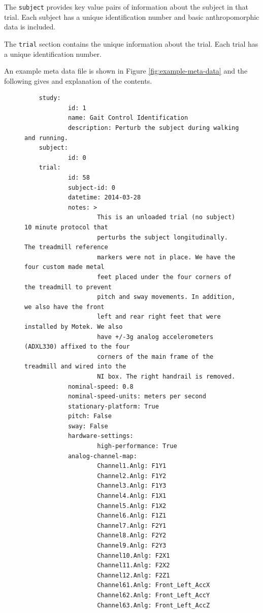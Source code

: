 \documentclass{article}
\begin{document}
The \verb+subject+ provides key value pairs of information about the subject in
that trial. Each subject has a unique identification number and basic
anthropomorphic data is included.

The \verb+trial+ section contains the unique information about the trial. Each
trial has a unique identification number.

An example meta data file is shown in Figure \ref{fig:example-meta-data} and
the following gives and explanation of the contents.

\begin{figure}
  \small
  \begin{verbatim}
    study:
            id: 1
            name: Gait Control Identification
            description: Perturb the subject during walking and running.
    subject:
            id: 0
    trial:
            id: 58
            subject-id: 0
            datetime: 2014-03-28
            notes: >
                    This is an unloaded trial (no subject) 10 minute protocol that
                    perturbs the subject longitudinally. The treadmill reference
                    markers were not in place. We have the four custom made metal
                    feet placed under the four corners of the treadmill to prevent
                    pitch and sway movements. In addition, we also have the front
                    left and rear right feet that were installed by Motek. We also
                    have +/-3g analog accelerometers (ADXL330) affixed to the four
                    corners of the main frame of the treadmill and wired into the
                    NI box. The right handrail is removed.
            nominal-speed: 0.8
            nominal-speed-units: meters per second
            stationary-platform: True
            pitch: False
            sway: False
            hardware-settings:
                    high-performance: True
            analog-channel-map:
                    Channel1.Anlg: F1Y1
                    Channel2.Anlg: F1Y2
                    Channel3.Anlg: F1Y3
                    Channel4.Anlg: F1X1
                    Channel5.Anlg: F1X2
                    Channel6.Anlg: F1Z1
                    Channel7.Anlg: F2Y1
                    Channel8.Anlg: F2Y2
                    Channel9.Anlg: F2Y3
                    Channel10.Anlg: F2X1
                    Channel11.Anlg: F2X2
                    Channel12.Anlg: F2Z1
                    Channel61.Anlg: Front_Left_AccX
                    Channel62.Anlg: Front_Left_AccY
                    Channel63.Anlg: Front_Left_AccZ

\end{verbatim}
\end{figure}
\end{document}
